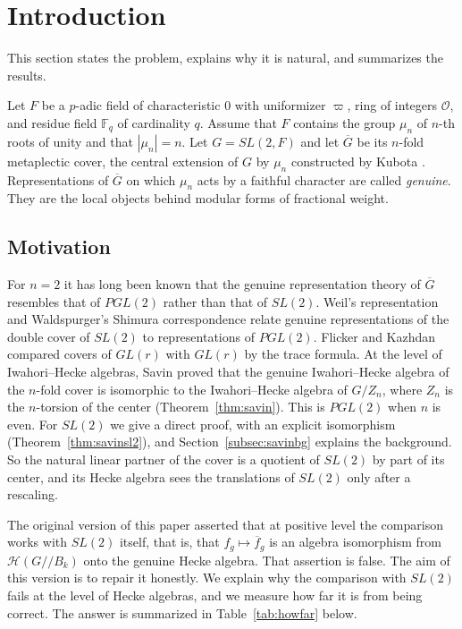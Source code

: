 \documentclass[12pt,letterpaper]{amsart}
\numberwithin{equation}{section}
\theoremstyle{definition}
\theoremstyle{remark}
\newcommand{\cO}{\mathcal{O}}
\newcommand{\cH}{\mathcal{H}}
\newcommand{\Fq}{\mathbb{F}_q}
\newcommand{\Gbar}{\overline{G}}
\newcommand{\fbar}{\overline{f}}
\begin{document}
\maketitle

\tableofcontents

\section{Introduction}
\label{section:intro}

This section states the problem, explains why it is natural, and
summarizes the results.

Let $F$ be a $p$-adic field of characteristic $0$ with uniformizer
$\varpi$, ring of integers $\cO$, and residue field $\Fq$ of
cardinality $q$. Assume that $F$ contains the group $\mu_n$ of $n$-th
roots of unity and that $|\mu_n|=n$. Let $G=SL(2,F)$ and let $\Gbar$
be its $n$-fold metaplectic cover, the central extension of $G$ by
$\mu_n$ constructed by Kubota \cite{Ku67}. Representations of $\Gbar$
on which $\mu_n$ acts by a faithful character are called
\emph{genuine}. They are the local objects behind modular forms of
fractional weight.

\subsection{Motivation}
For $n=2$ it has long been known that the genuine representation theory
of $\Gbar$ resembles that of $PGL(2)$ rather than that of $SL(2)$.
Weil's representation and Waldspurger's Shimura correspondence
\cite{Wa80} relate genuine representations of the double cover of
$SL(2)$ to representations of $PGL(2)$. Flicker and Kazhdan
\cite{Fl80,FK86} compared covers of $GL(r)$ with $GL(r)$ by the trace
formula. At the level of Iwahori--Hecke algebras, Savin \cite{Sa88}
proved that the genuine Iwahori--Hecke algebra of the $n$-fold cover is
isomorphic to the Iwahori--Hecke algebra of $G/Z_n$, where $Z_n$ is the
$n$-torsion of the center (Theorem~\ref{thm:savin}). This is $PGL(2)$
when $n$ is even. For $SL(2)$ we give a direct proof, with an explicit
isomorphism (Theorem~\ref{thm:savinsl2}), and
Section~\ref{subsec:savinbg} explains the background. So the natural linear partner of the cover is a
quotient of $SL(2)$ by part of its center, and its Hecke algebra sees
the translations of $SL(2)$ only after a rescaling.

The original version of this paper \cite{Jo98} asserted that at
positive level the comparison works with $SL(2)$ itself, that is, that
$f_g\mapsto\fbar_g$ is an algebra isomorphism from $\cH(G/\!/B_k)$ onto
the genuine Hecke algebra. That assertion is false. The aim of this
version is to repair it honestly. We explain why the comparison with
$SL(2)$ fails at the level of Hecke algebras, and we measure how far
it is from being correct. The answer is summarized in
Table~\ref{tab:howfar} below.
\end{document}
